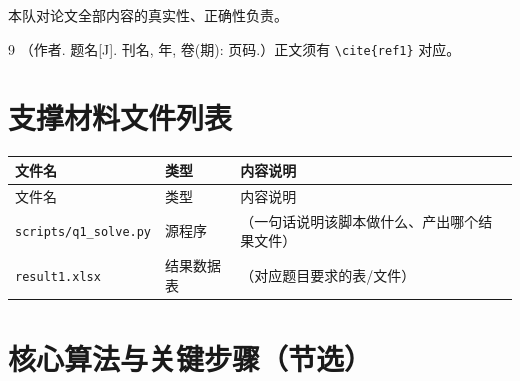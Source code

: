 \documentclass[withoutpreface,bwprint]{cumcmthesis}
\begin{document}
\noindent 本队对论文全部内容的真实性、正确性负责。

\begin{thebibliography}{9}
   （作者. 题名[J]. 刊名, 年, 卷(期): 页码.）正文须有 \verb|\cite{ref1}| 对应。
\end{thebibliography}

\clearpage
\appendix
\renewcommand{\thesubsection}{\thesection.\arabic{subsection}}

\section{支撑材料文件列表}

% 
\begin{longtable}{@{}p{5.2cm}p{2.2cm}p{7.6cm}@{}}
  \toprule
  文件名 & 类型 & 内容说明 \\
  \midrule
  \endfirsthead
  \toprule
  文件名 & 类型 & 内容说明 \\
  \midrule
  \endhead
  \texttt{scripts/q1\_solve.py} & 源程序 & （一句话说明该脚本做什么、产出哪个结果文件） \\
  \texttt{result1.xlsx} & 结果数据表 & （对应题目要求的表/文件） \\
  \bottomrule
\end{longtable}

\section{核心算法与关键步骤（节选）}



\end{document}
